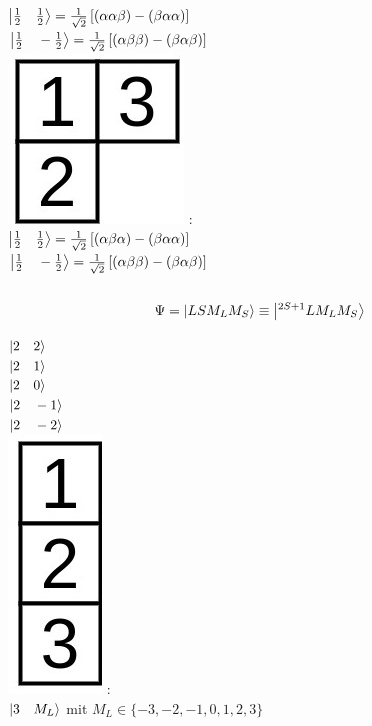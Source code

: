 \documentclass[12pt,a4paper]{article}
\begin{document}
$ \ket{\frac{1}{2} \quad\frac{1}{2}} = \frac{1}{\sqrt{2}} \left[ \left(\alpha\alpha \beta \right) - \left( \beta \alpha \alpha \right) \right]$ \\

$ \ket{\frac{1}{2} \quad-\frac{1}{2}}= \frac{1}{\sqrt{2}} \left[ \left( \alpha\beta \beta\right) - \left( \beta \alpha \beta\right) \right]$ \\

\includegraphics[scale=0.6]{build/young-13.jpg} : \\

$ \ket{\frac{1}{2} \quad\frac{1}{2}}= \frac{1}{\sqrt{2}} \left[ \left( \alpha \beta \alpha\right) - \left(\beta\alpha\alpha \right) \right]$  \\

$ \ket{\frac{1}{2} \quad-\frac{1}{2}}= \frac{1}{\sqrt{2}} \left[ \left( \alpha\beta\beta \right) - \left( \beta\alpha \beta\right) \right]$  \\ \\



$$\Psi = \ket{L S M_L M_S} \equiv \ket{{}^{2S+1}L M_L M_S} $$



\newpage

$ \ket{2 \quad 2}$ \\

$ \ket{2 \quad 1}$ \\

$ \ket{2 \quad 0}$ \\

$ \ket{2 \quad -1}$ \\

$ \ket{2 \quad -2}$ \\

\includegraphics[scale=0.6]{build/young-3unten.jpg} : \\
$\ket{ 3\quad  M_L} $ mit $M_L \in \{-3, -2, -1, 0, 1, 2, 3\}$\\
\end{document}
